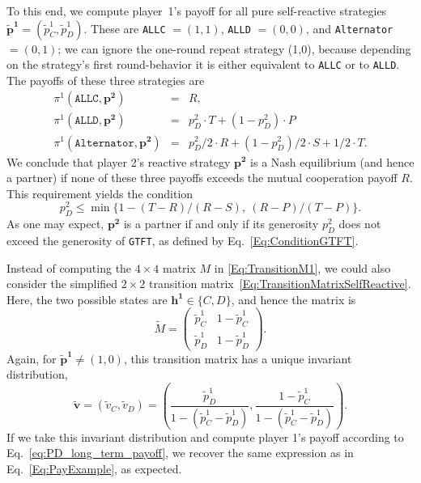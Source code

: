 \documentclass[11pt]{article}
\theoremstyle{plainCl1}
\theoremstyle{plainCl2}
\def\gtft{\texttt{GTFT}}
\def\allc{\texttt{ALLC}}
\def\alld{\texttt{ALLD}}
\def\alt{\texttt{Alternator}}
\begin{document}
To this end, we compute player~1's payoff for all pure self-reactive strategies $\mathbf{\tilde p^1}\!=\!(\tilde p^1_C, \tilde p^1_D)$. 
These are \allc{} $=\! (1,1)$, \alld{} $=\!(0,0)$, and \alt{} $=\!(0,1)$; we can ignore the one-round repeat strategy (1,0), because depending on the strategy's first round-behavior it is either equivalent to \allc{} or to \alld{}. The payoffs of these three strategies are
\begin{equation}
\begin{array}{rcl}
\pi^1(\allc,\mathbf{p^2}) &= &R,\\[0.2cm]
\pi^1(\alld,\mathbf{p^2}) &= &p^2_D \!\cdot \!T +(1\!-\!p^2_D) \!\cdot\!P\\[0.2cm]
\pi^1(\alt,\mathbf{p^2})	&=	& p^2_D/2\!\cdot\!R + (1\!-\!p^2_D)/2\!\cdot\!S + 1/2\!\cdot\! T.
\end{array}
\end{equation}
We conclude that player 2's reactive strategy $\mathbf{p^2}$ is a Nash equilibrium (and hence a partner) if none of these three payoffs exceeds the mutual cooperation payoff $R$. This requirement yields the condition
\begin{equation}
p^2_D \le \min\big\{1\!-\!(T\!-\!R)/(R\!-\!S),~(R\!-\!P)/(T\!-\!P)\big\}.
\end{equation}
As one may expect, $\mathbf{p^2}$ is a partner if and only if its generosity $p^2_D$ does not exceed the generosity of \gtft, as defined by Eq.~\eqref{Eq:ConditionGTFT}. 

Instead of computing the $4\times4$ matrix $M$ in \eqref{Eq:TransitionM1}, we could also consider the simplified $2\!\times\!2$ transition matrix~\eqref{Eq:TransitionMatrixSelfReactive}. Here, the two possible states are $\mathbf{h^1}\!\in\!\{C,D\}$, and hence the matrix is
\begin{equation}
\tilde{M} = \left(
\begin{array}{cc}
\tilde{p}^1_C	&1\!-\!\tilde p^1_C\\
\tilde p^1_D	&1\!-\!\tilde p^1_D
\end{array}
\right). 
\end{equation}
Again, for $\mathbf{\tilde p^1} \!\neq\! (1,0)$, this transition matrix has a unique invariant distribution,
\begin{equation}
\mathbf{\tilde v} = (\tilde v_C, \tilde v_D) = \left( \frac{\tilde p^1_D}{1-({\tilde p^1_C} - {\tilde p^1_D})}, \frac{1\!-\!\tilde p^1_C}{1-({\tilde p^1_C} - {\tilde p^1_D})} \right).
\end{equation}
If we take this invariant distribution and compute player 1's payoff according to Eq.~\eqref{eq:PD_long_term_payoff}, we recover the same expression as in Eq.~\eqref{Eq:PayExample}, as expected.
\end{document}
